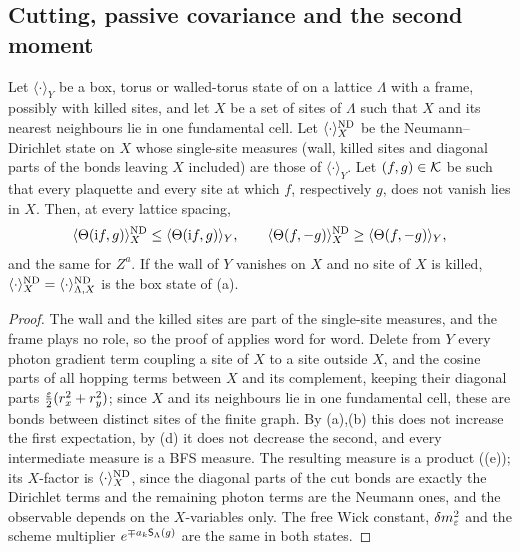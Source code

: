 \subsection{Cutting, passive covariance and the second moment}

\begin{lemma}\label{rot:lem:cutwall}
Let $\langle\cdot\rangle_Y$ be a box, torus or walled-torus state of  on a lattice $\Lambda$ with a frame, possibly with killed sites, and let $X$ be a set of sites of $\Lambda$ such that $X$ and its nearest neighbours lie in one fundamental cell. Let $\langle\cdot\rangle^{\mathrm{ND}}_X$ be the Neumann--Dirichlet state on $X$ whose single-site measures (wall, killed sites and diagonal parts of the bonds leaving $X$ included) are those of $\langle\cdot\rangle_Y$. Let $(f,g)\in\mathcal K$ be such that every plaquette and every site at which $f$, respectively $g$, does not vanish lies in $X$. Then, at every lattice spacing,
\[
\langle\Theta(\mathrm if,g)\rangle^{\mathrm{ND}}_X\le\langle\Theta(\mathrm if,g)\rangle_Y,\qquad
\langle\Theta(f,-g)\rangle^{\mathrm{ND}}_X\ge\langle\Theta(f,-g)\rangle_Y ,
\]
and the same for $Z^a$. If the wall of $Y$ vanishes on $X$ and no site of $X$ is killed, $\langle\cdot\rangle^{\mathrm{ND}}_X=\langle\cdot\rangle^{\mathrm{ND}}_{\Lambda,X}$ is the box state of (a).
\end{lemma}

\begin{proof}
The wall and the killed sites are part of the single-site measures, and the frame plays no role, so the proof of  applies word for word. Delete from $Y$ every photon gradient term coupling a site of $X$ to a site outside $X$, and the cosine parts of all hopping terms between $X$ and its complement, keeping their diagonal parts $\frac{\varepsilon}2(r_x^2+r_y^2)$; since $X$ and its neighbours lie in one fundamental cell, these are bonds between distinct sites of the finite graph. By (a),(b) this does not increase the first expectation, by (d) it does not decrease the second, and every intermediate measure is a BFS measure. The resulting measure is a product ((e)); its $X$-factor is $\langle\cdot\rangle^{\mathrm{ND}}_X$, since the diagonal parts of the cut bonds are exactly the Dirichlet terms and the remaining photon terms are the Neumann ones, and the observable depends on the $X$-variables only. The free Wick constant, $\delta m^2_{\varepsilon}$ and the scheme multiplier $e^{\mp a_k\mathsf S_\Lambda(g)}$ are the same in both states.
\end{proof}

